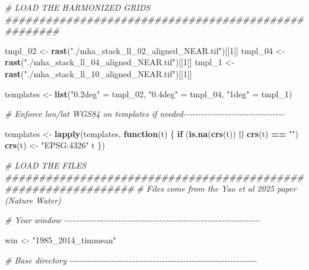 \documentclass[
  11pt,
]{article}
\newenvironment{Shaded}{\begin{snugshade}}{\end{snugshade}}
\newcommand{\CommentTok}[1]{\textcolor[rgb]{0.56,0.35,0.01}{\textit{#1}}}
\newcommand{\ControlFlowTok}[1]{\textcolor[rgb]{0.13,0.29,0.53}{\textbf{#1}}}
\newcommand{\DecValTok}[1]{\textcolor[rgb]{0.00,0.00,0.81}{#1}}
\newcommand{\FunctionTok}[1]{\textcolor[rgb]{0.13,0.29,0.53}{\textbf{#1}}}
\newcommand{\NormalTok}[1]{#1}
\newcommand{\OtherTok}[1]{\textcolor[rgb]{0.56,0.35,0.01}{#1}}
\newcommand{\SpecialCharTok}[1]{\textcolor[rgb]{0.81,0.36,0.00}{\textbf{#1}}}
\newcommand{\StringTok}[1]{\textcolor[rgb]{0.31,0.60,0.02}{#1}}
\begin{document}
\begin{Shaded}
\begin{Highlighting}[]
\CommentTok{\# LOAD THE HARMONIZED GRIDS \#\#\#\#\#\#\#\#\#\#\#\#\#\#\#\#\#\#\#\#\#\#\#\#\#\#\#\#\#\#\#\#\#\#\#\#\#\#\#\#\#\#\#\#\#\#\#\#\#\#\#\#}

\NormalTok{tmpl\_02 }\OtherTok{\textless{}{-}} \FunctionTok{rast}\NormalTok{(}\StringTok{"./mha\_stack\_ll\_02\_aligned\_NEAR.tif"}\NormalTok{)[[}\DecValTok{1}\NormalTok{]]}
\NormalTok{tmpl\_04 }\OtherTok{\textless{}{-}} \FunctionTok{rast}\NormalTok{(}\StringTok{"./mha\_stack\_ll\_04\_aligned\_NEAR.tif"}\NormalTok{)[[}\DecValTok{1}\NormalTok{]]}
\NormalTok{tmpl\_1 }\OtherTok{\textless{}{-}} \FunctionTok{rast}\NormalTok{(}\StringTok{"./mha\_stack\_ll\_10\_aligned\_NEAR.tif"}\NormalTok{)[[}\DecValTok{1}\NormalTok{]]}

\NormalTok{templates }\OtherTok{\textless{}{-}} \FunctionTok{list}\NormalTok{(}\StringTok{"0.2deg"} \OtherTok{=}\NormalTok{ tmpl\_02, }\StringTok{"0.4deg"} \OtherTok{=}\NormalTok{ tmpl\_04, }\StringTok{"1deg"} \OtherTok{=}\NormalTok{ tmpl\_1)}

\CommentTok{\# Enforce lon/lat WGS84 on templates if needed{-}{-}{-}{-}{-}{-}{-}{-}{-}{-}{-}{-}{-}{-}{-}{-}{-}{-}{-}{-}{-}{-}{-}{-}{-}{-}{-}{-}{-}{-}{-}{-}{-}{-}}

\NormalTok{templates }\OtherTok{\textless{}{-}} \FunctionTok{lapply}\NormalTok{(templates, }\ControlFlowTok{function}\NormalTok{(t) \{}
  \ControlFlowTok{if}\NormalTok{ (}\FunctionTok{is.na}\NormalTok{(}\FunctionTok{crs}\NormalTok{(t)) }\SpecialCharTok{||} \FunctionTok{crs}\NormalTok{(t) }\SpecialCharTok{==} \StringTok{""}\NormalTok{) }\FunctionTok{crs}\NormalTok{(t) }\OtherTok{\textless{}{-}} \StringTok{"EPSG:4326"}
\NormalTok{  t}
\NormalTok{\})}

\CommentTok{\# LOAD THE FILES \#\#\#\#\#\#\#\#\#\#\#\#\#\#\#\#\#\#\#\#\#\#\#\#\#\#\#\#\#\#\#\#\#\#\#\#\#\#\#\#\#\#\#\#\#\#\#\#\#\#\#\#\#\#\#\#\#\#\#\#\#\#\#}
\CommentTok{\# Files come from the Yao et al 2025 paper (Nature Water)}

\CommentTok{\# Year window {-}{-}{-}{-}{-}{-}{-}{-}{-}{-}{-}{-}{-}{-}{-}{-}{-}{-}{-}{-}{-}{-}{-}{-}{-}{-}{-}{-}{-}{-}{-}{-}{-}{-}{-}{-}{-}{-}{-}{-}{-}{-}{-}{-}{-}{-}{-}{-}{-}{-}{-}{-}{-}{-}{-}{-}{-}{-}{-}{-}{-}{-}{-}{-}{-}{-}}

\NormalTok{win }\OtherTok{\textless{}{-}} \StringTok{"1985\_2014\_timmean"}

\CommentTok{\# Base directory {-}{-}{-}{-}{-}{-}{-}{-}{-}{-}{-}{-}{-}{-}{-}{-}{-}{-}{-}{-}{-}{-}{-}{-}{-}{-}{-}{-}{-}{-}{-}{-}{-}{-}{-}{-}{-}{-}{-}{-}{-}{-}{-}{-}{-}{-}{-}{-}{-}{-}{-}{-}{-}{-}{-}{-}{-}{-}{-}{-}{-}{-}{-}}


\end{Highlighting}
\end{Shaded}
\end{document}
